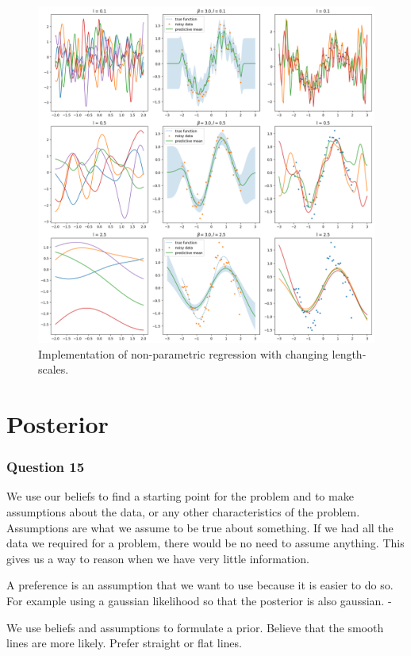 \documentclass[10pt, a4paper, twocolumn]{article} %
\begin{document}
\begin{figure}[!htb]
\centerline{\includegraphics[width=\linewidth]{non_parametric_regression.png}}
\caption{Implementation of non-parametric regression with changing length-scales. }
\label{fig2}
\end{figure}

\section{Posterior}

\subsubsection*{Question 15}
We use our beliefs to find a starting point for the problem and to make assumptions about the data, or any other characteristics of the problem. Assumptions are what we assume to be true about something. If we had all the data we required for a problem, there would be no need to assume anything. This gives us a way to reason when we have very little information. \par
A preference is an assumption that we want to use because it is easier to do so. For example using a gaussian likelihood so that the posterior is also gaussian. -

We use beliefs and assumptions to formulate a prior. Believe that the smooth lines are more likely. Prefer straight or flat lines.
\end{document}
